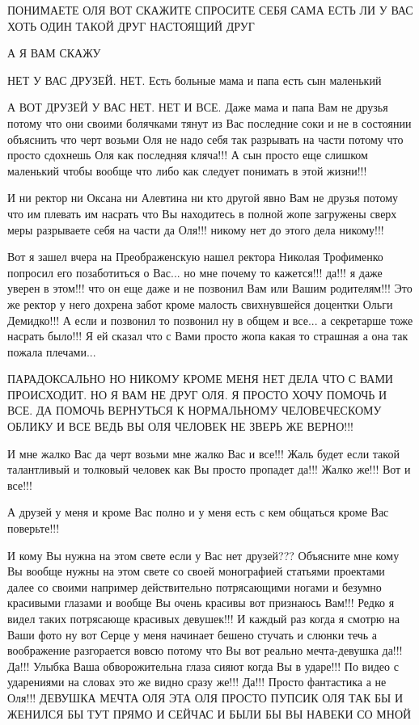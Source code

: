 ПОНИМАЕТЕ ОЛЯ ВОТ СКАЖИТЕ СПРОСИТЕ СЕБЯ САМА
  ЕСТЬ ЛИ У ВАС ХОТЬ ОДИН ТАКОЙ ДРУГ 
	  НАСТОЯЩИЙ ДРУГ

А Я ВАМ СКАЖУ

НЕТ У ВАС ДРУЗЕЙ. НЕТ. Есть больные мама и папа есть сын маленький

А ВОТ ДРУЗЕЙ У ВАС НЕТ. НЕТ И ВСЕ. Даже мама и папа Вам не друзья потому что
они своими болячками тянут из Вас последние соки и не в состоянии объяснить что
черт возьми Оля не надо себя так разрывать на части потому что просто сдохнешь
Оля как последняя кляча!!! А сын просто еще слишком маленький чтобы вообще
что либо как следует понимать в этой жизни!!!

И ни ректор ни Оксана ни Алевтина ни кто другой явно Вам не друзья
потому что им плевать им насрать что Вы находитесь в полной жопе загружены сверх
меры разрываете себя на части да Оля!!! никому нет до этого дела никому!!!

Вот я зашел вчера на Преображенскую нашел ректора Николая Трофименко попросил его позаботиться о Вас...
но мне почему то кажется!!! да!!! я даже уверен в этом!!! что он еще даже и не позвонил Вам или Вашим родителям!!!
Это же ректор у него дохрена забот кроме малость свихнувшейся доцентки Ольги Демидко!!!
А если и позвонил то позвонил ну в общем и все... а секретарше тоже насрать было!!!
Я ей сказал что с Вами просто жопа какая то страшная а она так пожала плечами...

ПАРАДОКСАЛЬНО НО НИКОМУ КРОМЕ МЕНЯ НЕТ ДЕЛА ЧТО С ВАМИ ПРОИСХОДИТ. 
НО Я ВАМ НЕ ДРУГ ОЛЯ. Я ПРОСТО ХОЧУ ПОМОЧЬ И ВСЕ.
ДА ПОМОЧЬ ВЕРНУТЬСЯ К НОРМАЛЬНОМУ ЧЕЛОВЕЧЕСКОМУ ОБЛИКУ И ВСЕ
ВЕДЬ ВЫ ОЛЯ ЧЕЛОВЕК НЕ ЗВЕРЬ ЖЕ ВЕРНО!!! 

И мне жалко Вас да черт возьми мне жалко Вас и все!!!
Жаль будет если такой талантливый и толковый человек как Вы просто пропадет да!!!
Жалко же!!! Вот и все!!!

А друзей у меня и кроме Вас полно и у меня есть с кем общаться
кроме Вас поверьте!!!

И кому Вы нужна на этом свете если у Вас нет друзей??? Объясните мне кому Вы
вообще нужны на этом свете со своей монографией статьями проектами далее со
своими например действительно потрясающими ногами и безумно красивыми глазами и
вообще Вы очень красивы вот признаюсь Вам!!! Редко я видел таких потрясающе
красивых девушек!!!  И каждый раз когда я смотрю на Ваши фото ну вот Серце у
меня начинает бешено стучать и слюнки течь а воображение разгорается вовсю
потому что Вы вот реально мечта-девушка да!!! Да!!! Улыбка Ваша обворожительна
глаза сияют когда Вы в ударе!!!  По видео с ударениями на словах это же видно
сразу же!!! Да!!!  Просто фантастика а не Оля!!! ДЕВУШКА МЕЧТА ОЛЯ ЭТА ОЛЯ ПРОСТО ПУПСИК ОЛЯ
ТАК БЫ И ЖЕНИЛСЯ БЫ ТУТ ПРЯМО И СЕЙЧАС И БЫЛИ БЫ ВЫ НАВЕКИ СО МНОЙ


